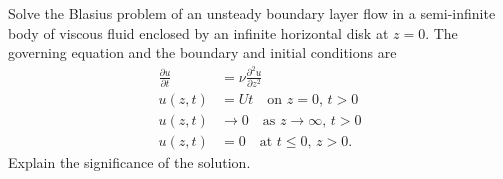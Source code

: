 \begin{problem}{4.22}
  Solve the Blasius problem of an unsteady boundary layer flow in a semi-infinite body
  of viscous fluid enclosed by an infinite horizontal disk at $z=0$. The governing equation
  and the boundary and initial conditions are
  \begin{align*}
    \frac{\partial u}{\partial t} &= \nu \frac{\partial ^2 u}{\partial z^2} \\
    u(z, t) &= U t \quad \text{on $z = 0$, $t > 0$} \\
    u(z, t) &\to 0 \quad \text{as $z \to \infty$, $t > 0$} \\
    u(z, t) &= 0 \quad \text{at $t \leq 0$, $z > 0$}.
  \end{align*}
  Explain the significance of the solution.
\end{problem}

